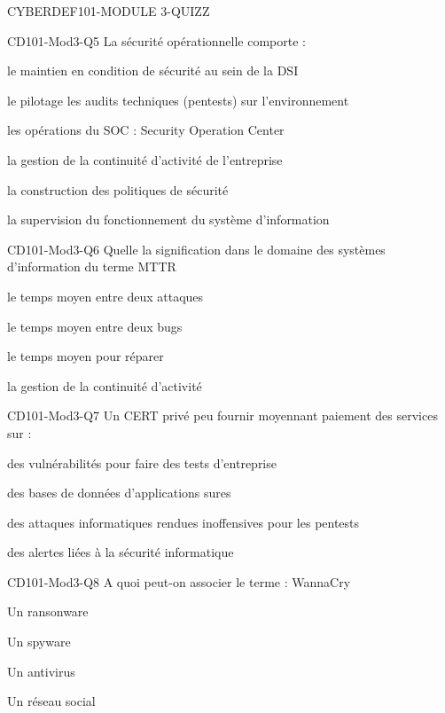 \documentclass[12pt]{article}
\begin{document}
\begin{quiz}{CYBERDEF101-MODULE 3-QUIZZ}
\begin{multi}[multiple=true]{CD101-Mod3-Q5} 
La sécurité opérationnelle comporte  : 
\item* le maintien en condition de sécurité au sein de la DSI
\item* le pilotage les audits techniques (pentests) sur l'environnement	
\item* les opérations du SOC : Security Operation Center	
\item la gestion de la continuité d'activité de l'entreprise
\item la construction des politiques de sécurité
\item la supervision du fonctionnement du système d'information
\end{multi}


\begin{multi}[multiple=true]{CD101-Mod3-Q6} 
Quelle la signification dans le domaine des systèmes d'information du terme MTTR 
\item le temps moyen entre deux attaques
\item le temps moyen entre deux bugs	
\item* le temps moyen pour réparer
\item la gestion de la continuité d'activité
\end{multi}

\begin{multi}[multiple=true]{CD101-Mod3-Q7} 
Un CERT privé peu fournir moyennant paiement des services sur :
\item* des vulnérabilités pour faire des tests d'entreprise
\item des bases de données d'applications sures 
\item des attaques informatiques rendues inoffensives pour les pentests	
\item* des alertes liées à la sécurité informatique
\end{multi}


\begin{multi}[multiple=true]{CD101-Mod3-Q8}
A quoi peut-on associer le terme : WannaCry 
\item* Un ransonware
\item Un spyware
\item Un antivirus
\item Un réseau social
\end{multi}


\end{quiz}
\end{document}
